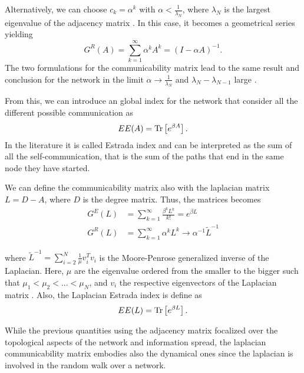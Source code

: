 Alternatively, we can choose $c_k = \alpha^{k}$ with $\alpha<\frac{1}{\lambda_N}$, where $\lambda_N$ is the largest eigenvalue of the adjacency matrix \cite{Katz}. In this case, it becomes a geometrical series yielding
\begin{equation}
    G^R(A) =\sum_{k=1}^{\infty} \alpha^k A^k = (I -\alpha A)^{-1}.
\end{equation}
The two formulations for the communicability matrix lead to the same result and conclusion for the network in the limit $\alpha \rightarrow \frac{1}{\lambda_N}$ and $\lambda_N -\lambda_{N-1}$ large \cite{Benzi_Klymko}.


From this, we can introduce an global index for the network that consider all the different possible communication as
\begin{equation}
    EE(A)  = \operatorname{Tr}\left[e^{\beta A}\right].
\end{equation}
In the literature it is called Estrada index \cite{Estrada_2008} and can be interpreted as the sum of all the self-communication, that is the sum of the paths that end in the same node they have started.

We can define the communicability matrix also with the laplacian matrix $L = D - A$, where $D$ is the degree matrix. 
Thus, the matrices becomes \cite{Estrada_2012}
\begin{equation}\label{Estrada indeces}
    \begin{split}
        G^E(L) &=\sum_{k=1}^{\infty} \frac{\beta^k L^k}{k!} = e^{\beta L}  \\ 
        G^R(L) &= \sum_{k=1}^{\infty} \alpha^k L^k \rightarrow \alpha^{-1} \tilde{L}^{-1}
    \end{split}
\end{equation}

where $\tilde{L}^{-1} = \sum_{i=2}^N \frac{1}{\mu}v_i^Tv_i$ is the Moore-Penrose generalized inverse of the Laplacian. Here, $\mu$ are the eigenvalue ordered from the smaller to the bigger such that $\mu_1 < \mu_2 < ... < \mu_N$, and $v_i$ the respective eigenvectors of the Laplacian matrix \cite{Generalized_inverse_Laplacian}.
Also, the Laplacian Estrada index is define as
\begin{equation}\label{EE_L}
    EE(L) = \operatorname{Tr}\left[e^{\beta L}\right].
\end{equation}

While the previous quantities using the adjacency matrix focalized over the topological aspects of the network and information spread, the laplacian communicability matrix embodies also the dynamical ones since the laplacian is involved in the random walk over a network. 

